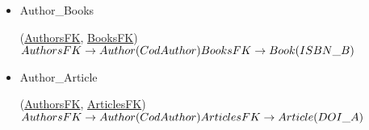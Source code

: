 \begin{itemize}
\item Author\_Books

(\underline{AuthorsFK}, \underline{BooksFK})\\

$AuthorsFK \rightarrow Author(CodAuthor)\\
 BooksFK \rightarrow Book(ISBN\_B)$\\
 
 \item Author\_Article

(\underline{AuthorsFK}, \underline{ArticlesFK})\\

$AuthorsFK \rightarrow Author(CodAuthor)\\
ArticlesFK \rightarrow Article(DOI\_A)
$

\end{itemize}
